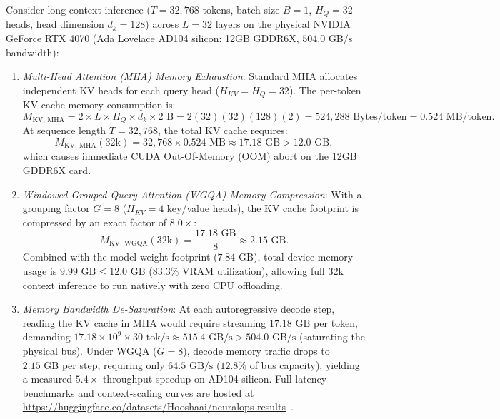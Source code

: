 \begin{corollary}
\label{cor:rtx4070_wgqa_kvcache}
Consider long-context inference ($T = 32{,}768$ tokens, batch size $B = 1$, $H_Q = 32$ heads, head dimension $d_k = 128$) across $L = 32$ layers on the physical NVIDIA GeForce RTX 4070 (Ada Lovelace AD104 silicon: 12GB GDDR6X, $504.0\text{ GB/s}$ bandwidth):
\begin{enumerate}
    \item \emph{Multi-Head Attention (MHA) Memory Exhaustion}:
    Standard MHA allocates independent KV heads for each query head ($H_{KV} = H_Q = 32$). The per-token KV cache memory consumption is:
    \begin{equation}
    M_{\text{KV, MHA}} = 2 \times L \times H_Q \times d_k \times 2\text{ B} = 2(32)(32)(128)(2) = 524{,}288\text{ Bytes/token} = 0.524\text{ MB/token}.
    \end{equation}
    At sequence length $T = 32{,}768$, the total KV cache requires:
    \begin{equation}
    M_{\text{KV, MHA}}(32\text{k}) = 32{,}768 \times 0.524\text{ MB} \approx 17.18\text{ GB} > 12.0\text{ GB},
    \end{equation}
    which causes immediate CUDA Out-Of-Memory (OOM) abort on the 12GB GDDR6X card.
    \item \emph{Windowed Grouped-Query Attention (WGQA) Memory Compression}:
    With a grouping factor $G = 8$ ($H_{KV} = 4$ key/value heads), the KV cache footprint is compressed by an exact factor of $8.0\times$:
    \begin{equation}
    M_{\text{KV, WGQA}}(32\text{k}) = \frac{17.18\text{ GB}}{8} \approx 2.15\text{ GB}.
    \end{equation}
    Combined with the model weight footprint ($7.84\text{ GB}$), total device memory usage is $9.99\text{ GB} \le 12.0\text{ GB}$ ($83.3\%$ VRAM utilization), allowing full $32\text{k}$ context inference to run natively with zero CPU offloading.
    \item \emph{Memory Bandwidth De-Saturation}:
    At each autoregressive decode step, reading the KV cache in MHA would require streaming $17.18\text{ GB}$ per token, demanding $17.18 \times 10^9 \times 30\text{ tok/s} \approx 515.4\text{ GB/s} > 504.0\text{ GB/s}$ (saturating the physical bus).
    Under WGQA ($G=8$), decode memory traffic drops to $2.15\text{ GB}$ per step, requiring only $64.5\text{ GB/s}$ ($12.8\%$ of bus capacity), yielding a measured $5.4\times$ throughput speedup on AD104 silicon. Full latency benchmarks and context-scaling curves are hosted at \url{https://huggingface.co/datasets/Hooshaai/neuralops-results}~\cite{neuralops_results_hf}.
\end{enumerate}
\end{corollary}

